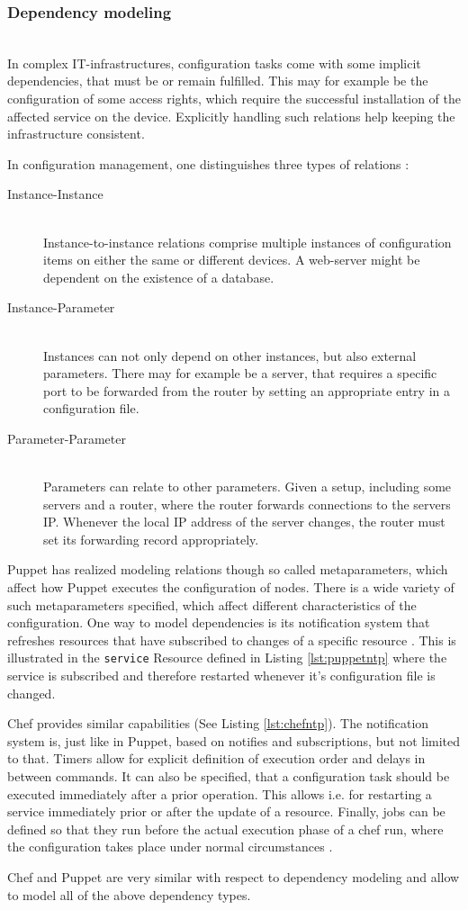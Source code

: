 \subsubsection{Dependency modeling}\hfill\\
In complex IT-infrastructures, configuration tasks come with some implicit dependencies, that must be or remain fulfilled. This may for example be the configuration of some access rights, which require the successful installation of the affected service on the device. Explicitly handling such relations help keeping the infrastructure consistent.

In configuration management, one distinguishes three types of relations \cite{delaet2010survey}:
\begin{description}
\item[Instance-Instance] \hfill \\ 
Instance-to-instance relations comprise multiple instances of configuration items on either the same or different devices. A web-server might be dependent on the existence of a database.
\item[Instance-Parameter] \hfill \\ 
Instances can not only depend on other instances, but also external parameters. There may for example be a server, that requires a specific port to be forwarded from the router by setting an appropriate entry in a configuration file.
\item[Parameter-Parameter] \hfill \\ 
Parameters can relate to other parameters. Given a setup, including some servers and a router, where the router forwards connections to the servers IP. Whenever the local IP address of the server changes, the router must set its forwarding record appropriately.
\end{description}

Puppet has realized modeling relations though so called metaparameters, which affect how Puppet executes the configuration of nodes. There is a wide variety of such metaparameters specified, which affect different characteristics of the configuration. One way to model dependencies is its notification system that refreshes resources that have subscribed to changes of a specific resource \cite{puppetcommetaparameter}. This is illustrated in the \texttt{service} Resource defined in Listing \ref{lst:puppetntp} where the service is subscribed and therefore restarted whenever it's configuration file is changed. 

Chef provides similar capabilities (See Listing \ref{lst:chefntp}). The notification system is, just like in Puppet, based on notifies and subscriptions, but not limited to that. Timers allow for explicit definition of execution order and delays in between commands. It can also be specified, that a configuration task should be executed immediately after a prior operation. This allows i.e. for restarting a service immediately prior or after the update of a resource. Finally, jobs can be defined so that they run before the actual execution phase of a chef run, where the configuration takes place under normal circumstances \cite{chefiocommonfunc}.

Chef and Puppet are very similar with respect to dependency modeling and allow to model all of the above dependency types.